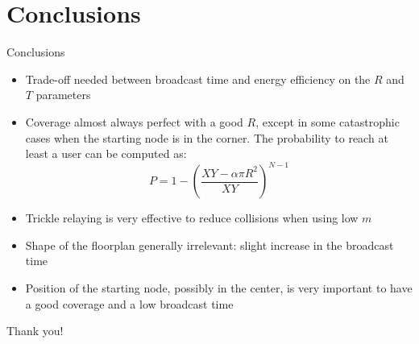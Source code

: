 \documentclass[aspectratio=169]{beamer}
\begin{document}
\section{Conclusions}

\begin{frame}{Conclusions}
	\large
	\begin{itemize}
		\item Trade-off needed between broadcast time and energy
			efficiency on the \(R\) and \(T\) parameters
		\item Coverage almost always perfect with a good \(R\), except
			in some catastrophic cases when the starting node is in
			the corner. The probability to reach at least a user can
			be computed as:
			\[
				P = 1 - {\left(\frac{XY - \alpha\pi R^2}{XY}\right)}^{N-1}
			\]
		\item Trickle relaying is very effective to reduce collisions
			when using low \(m\)
		\item Shape of the floorplan generally irrelevant: slight
			increase in the broadcast time
		\item Position of the starting node, possibly in the center, is
			very important to have a good coverage and a low
			broadcast time
	\end{itemize}
\end{frame}

\begin{frame}
    \centering
    \Huge \color{blue} Thank you!
\end{frame}
\end{document}
